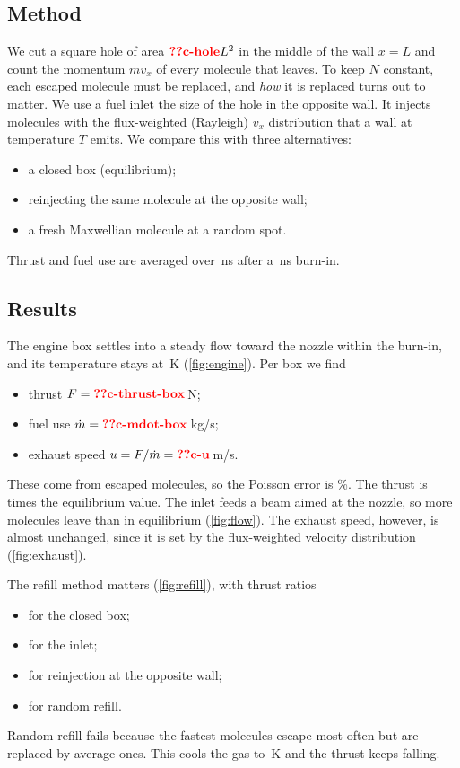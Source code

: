 \documentclass[aps,prd,twocolumn,nofootinbib,floatfix,superscriptaddress]{revtex4-2}
\begin{document}
\subsection{Method}
We cut a square hole of area $\val{c-hole}L^2$ in the middle of the wall $x=L$ and count the momentum $mv_x$ of every molecule that leaves.
To keep $N$ constant, each escaped molecule must be replaced, and \emph{how} it is replaced turns out to matter.
We use a fuel inlet the size of the hole in the opposite wall.
It injects molecules with the flux-weighted (Rayleigh) $v_x$ distribution that a wall at temperature $T$ emits.
We compare this with three alternatives:
\begin{itemize}
\item a closed box (equilibrium);
\item reinjecting the same molecule at the opposite wall;
\item a fresh Maxwellian molecule at a random spot.
\end{itemize}
Thrust and fuel use are averaged over \,ns after a \,ns burn-in.

\subsection{Results}
The engine box settles into a steady flow toward the nozzle within the burn-in, and its temperature stays at \,K (\cref{fig:engine}).
Per box we find
\begin{itemize}
\item thrust $F=\val{c-thrust-box}$\,N;
\item fuel use $\dot m=\val{c-mdot-box}$\,kg/s;
\item exhaust speed $u=F/\dot m=\val{c-u}$\,m/s.
\end{itemize}
These come from  escaped molecules, so the Poisson error is \%.
The thrust is  times the equilibrium value.
The inlet feeds a beam aimed at the nozzle, so more molecules leave than in equilibrium (\cref{fig:flow}).
The exhaust speed, however, is almost unchanged, since it is set by the flux-weighted velocity distribution (\cref{fig:exhaust}).

The refill method matters (\cref{fig:refill}), with thrust ratios
\begin{itemize}
\item {} for the closed box;
\item {} for the inlet;
\item {} for reinjection at the opposite wall;
\item {} for random refill.
\end{itemize}
Random refill fails because the fastest molecules escape most often but are replaced by average ones.
This cools the gas to \,K and the thrust keeps falling.
\end{document}
